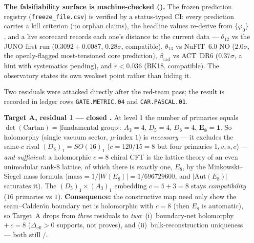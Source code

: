 \documentclass[11pt,a4paper]{article}
\begin{document}
\par\smallskip\noindent\textbf{The falsifiability surface is machine-checked ().}
The frozen prediction registry (\texttt{freeze\_file.csv}) is verified by a status-typed CI: every prediction
carries a kill criterion (no orphan claims), the headline values re-derive from $\{\varphi_0\}$, and a live scorecard
records each one's distance to the current data --- $\theta_{12}$ vs the JUNO first run ($0.3092{\pm}0.0087$,
$0.28\sigma$, compatible), $\theta_{13}$ vs NuFIT~6.0 NO ($2.0\sigma$, the openly-flagged most-tensioned core
prediction), $\beta_{\mathrm{rad}}$ vs ACT~DR6 ($0.37\sigma$, a hint with systematics pending), and $r<0.036$
(BK18, compatible). The observatory states its own weakest point rather than hiding it.

\begin{winbox}
Two residuals were attacked directly after the red-team pass; the result is recorded in ledger rows
\texttt{GATE.METRIC.04} and \texttt{CAR.PASCAL.01}.

\smallskip\noindent\textbf{Target A, residual 1 --- closed \mE.} At level 1 the number of primaries equals
$\det(\text{Cartan})=|\text{fundamental group}|$: $A_3{=}4$, $D_5{=}4$, $D_8{=}4$, $\mathbf{E_8{=}1}$. So holomorphy
(single vacuum sector, $\mu$-index $1$) is \emph{necessary} --- it excludes the same-$c$ rival $(D_8)_1=SO(16)_1$
($c=120/15=8$ but four primaries $1,v,s,c$) --- \emph{and sufficient}: a holomorphic $c=8$ chiral CFT is the lattice
theory of an even unimodular rank-$8$ lattice, of which there is exactly one, $E_8$, by the Minkowski--Siegel mass
formula ($\text{mass}=1/|W(E_8)|=1/696729600$, and $|\mathrm{Aut}(E_8)|$ saturates it). The
$(D_5)_1\times(A_3)_1$ embedding $c=5+3=8$ stays \emph{compatibility} ($16$ primaries vs $1$). \textbf{Consequence:}
the constructive map need only show the seam--Calder\'on boundary net is holomorphic with $c=8$ (then $E_8$ is
automatic), so Target~A drops from \emph{three} residuals to \emph{two}: (i)~boundary-net holomorphy $+\,c=8$
($\Delta_{\mathrm{eff}}>0$ supports, not proves), and (ii)~bulk-reconstruction uniqueness --- both still \mC/\mO.


\end{winbox}
\end{document}
